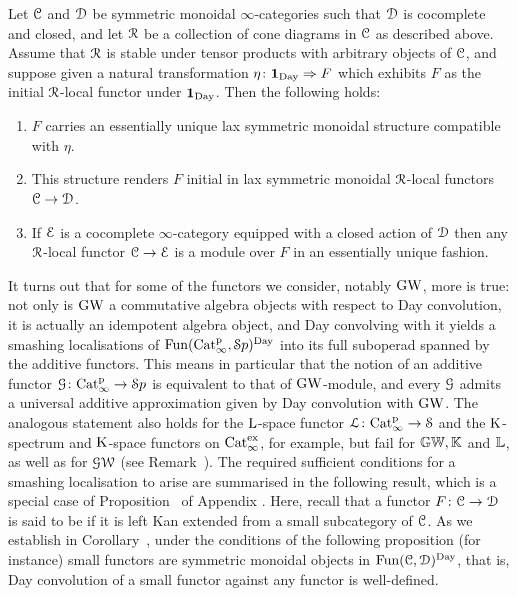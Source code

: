 \begin{proposition}
\label{proposition:universal-unit}%
Let $\mathcal C$ and $\mathcal{D}$ be symmetric monoidal $\infty$-categories %
such that $\mathcal{D}$ is cocomplete and closed, %
and let $\mathcal{R}$ be a collection of cone diagrams in $\mathcal C$ as described above. Assume that $\mathcal{R}$ is stable under tensor products with arbitrary objects of $\mathcal C$, and suppose given a natural transformation $\eta\colon \mathbf{1}_{\mathrm{Day}} \Rightarrow F$ which exhibits $F$ as the initial $\mathcal{R}$-local functor under $\mathbf{1}_{\mathrm{Day}}$. Then the following holds:
\begin{enumerate}
\item
$F$ carries an essentially unique lax symmetric monoidal structure compatible with $\eta$.
\item
This structure renders $F$ initial in lax symmetric monoidal $\mathcal{R}$-local functors $\mathcal C \to \mathcal{D}$. 
\item
If $\mathcal{E}$ is a cocomplete $\infty$-category equipped with a closed action of $\mathcal{D}$ then any $\mathcal{R}$-local functor $\mathcal C \rightarrow \mathcal{E}$ is a module over $F$ in an essentially unique fashion.
\end{enumerate}
\end{proposition}


It turns out that for some of the functors we consider, notably $\operatorname{GW}$, more is true: not only is $\operatorname{GW}$ a commutative algebra objects with respect to Day convolution, it is actually an idempotent algebra object, and Day convolving with it yields a smashing localisations of $\operatorname{Fun}(\mathrm{Cat}^{\mathrm p}_\infty,{\mathcal Sp})^{\mathrm{Day}}$ into its full suboperad spanned by the additive 
functors. This means in particular that the notion of an additive functor $\mathcal{G}\colon \mathrm{Cat}^{\mathrm p}_\infty \to {\mathcal Sp}$ is equivalent to that of $\operatorname{GW}$-module, and every $\mathcal{G}$ admits a universal additive approximation given by Day convolution with $\operatorname{GW}$. The analogous statement also holds for the $\operatorname L$-space functor $\operatorname{\mathcal{L}}\colon \mathrm{Cat}^{\mathrm p}_\infty \to \mathcal S$ and the $\operatorname K$-spectrum and $\operatorname K$-space functors on $\mathrm{Cat}_\infty^{\mathrm{ex}}$,
for example, but fail for $\mathbb{GW},\mathbb K$ and $\mathbb{L}$, as well as for $\operatorname{\mathcal{GW}}$ (see Remark~). The required sufficient conditions for a smashing localisation to arise are summarised in the following result, %
which is a special case of Proposition~ of Appendix . Here, recall that a functor $F\colon \mathcal C \to \mathcal{D}$ is said to be  if it is left Kan extended from a small subcategory of $\mathcal C$. As we establish in Corollary~, under the conditions of the following proposition (for instance) small functors are symmetric monoidal objects in $\operatorname{Fun}(\mathcal C,\mathcal{D})^{\mathrm{Day}}$,
that is, Day convolution of a small functor against any functor is well-defined.

